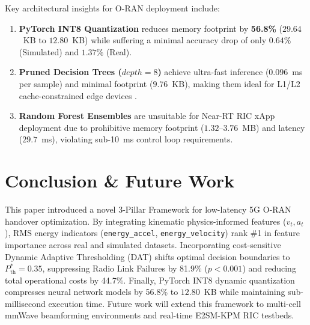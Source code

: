 \documentclass[conference]{IEEEtran}
\begin{document}
Key architectural insights for O-RAN deployment include:
\begin{enumerate}
    \item \textbf{PyTorch INT8 Quantization} reduces memory footprint by \textbf{56.8\%} ($29.64$~KB to $12.80$~KB) while suffering a minimal accuracy drop of only $0.64\%$ (Simulated) and $1.37\%$ (Real).
    \item \textbf{Pruned Decision Trees ($depth=8$)} achieve ultra-fast inference ($0.096$~ms per sample) and minimal footprint ($9.76$~KB), making them ideal for L1/L2 cache-constrained edge devices \cite{pruned_trees_dinh}.
    \item \textbf{Random Forest Ensembles} are unsuitable for Near-RT RIC xApp deployment due to prohibitive memory footprint ($1.32$--$3.76$~MB) and latency ($29.7$~ms), violating sub-10~ms control loop requirements.
\end{enumerate}

\section{Conclusion \& Future Work}
\label{sec:conclusion}
This paper introduced a novel 3-Pillar Framework for low-latency 5G O-RAN handover optimization. By integrating kinematic physics-informed features ($v_t, a_t$), RMS energy indicators (\texttt{energy\_accel}, \texttt{energy\_velocity}) rank \#1 in feature importance across real and simulated datasets. Incorporating cost-sensitive Dynamic Adaptive Thresholding (DAT) shifts optimal decision boundaries to $P_{\text{th}}^* = 0.35$, suppressing Radio Link Failures by 81.9\% ($p < 0.001$) and reducing total operational costs by 44.7\%. Finally, PyTorch INT8 dynamic quantization compresses neural network models by 56.8\% to $12.80$~KB while maintaining sub-millisecond execution time. Future work will extend this framework to multi-cell mmWave beamforming environments and real-time E2SM-KPM RIC testbeds.
\end{document}
